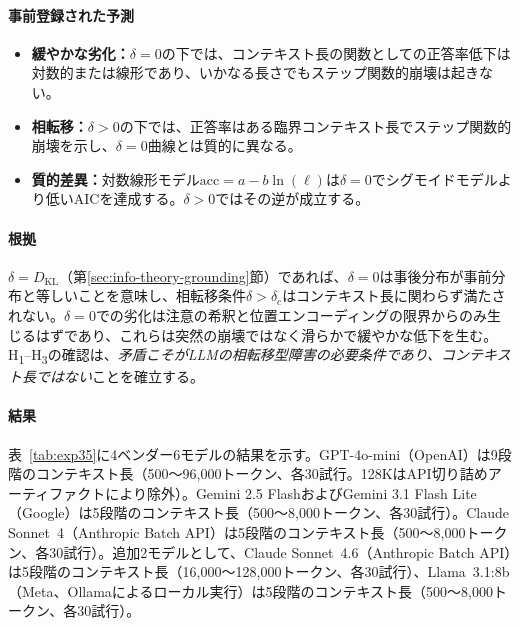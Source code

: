 \documentclass[11pt,a4paper]{article}
\begin{document}
\paragraph{事前登録された予測}
\begin{itemize}
  \item[\textbf{H\textsubscript{1}}] \textbf{緩やかな劣化：}$\delta = 0$の下では、コンテキスト長の関数としての正答率低下は対数的または線形であり、いかなる長さでもステップ関数的崩壊は起きない。
  \item[\textbf{H\textsubscript{2}}] \textbf{相転移：}$\delta > 0$の下では、正答率はある臨界コンテキスト長でステップ関数的崩壊を示し、$\delta = 0$曲線とは質的に異なる。
  \item[\textbf{H\textsubscript{3}}] \textbf{質的差異：}対数線形モデル$\text{acc} = a - b \ln(\ell)$は$\delta = 0$でシグモイドモデルより低いAICを達成する。$\delta > 0$ではその逆が成立する。
\end{itemize}

\paragraph{根拠}
$\delta = D_{\mathrm{KL}}$（第\ref{sec:info-theory-grounding}節）であれば、$\delta = 0$は事後分布が事前分布と等しいことを意味し、相転移条件$\delta > \delta_c$はコンテキスト長に関わらず満たされない。$\delta = 0$での劣化は注意の希釈と位置エンコーディングの限界からのみ生じるはずであり、これらは突然の崩壊ではなく滑らかで緩やかな低下を生む。H\textsubscript{1}--H\textsubscript{3}の確認は、\emph{矛盾こそがLLMの相転移型障害の必要条件であり、コンテキスト長ではない}ことを確立する。

\paragraph{結果}
表~\ref{tab:exp35}に4ベンダー6モデルの結果を示す。GPT-4o-mini（OpenAI）は9段階のコンテキスト長（500〜96{,}000トークン、各30試行。128KはAPI切り詰めアーティファクトにより除外）。Gemini 2.5 FlashおよびGemini 3.1 Flash Lite（Google）は5段階のコンテキスト長（500〜8{,}000トークン、各30試行）。Claude Sonnet~4（Anthropic Batch API）は5段階のコンテキスト長（500〜8{,}000トークン、各30試行）。追加2モデルとして、Claude Sonnet~4.6（Anthropic Batch API）は5段階のコンテキスト長（16{,}000〜128{,}000トークン、各30試行）、Llama~3.1:8b（Meta、Ollamaによるローカル実行）は5段階のコンテキスト長（500〜8{,}000トークン、各30試行）。
\end{document}
